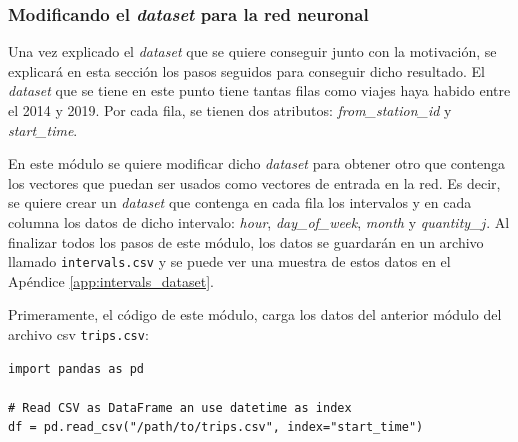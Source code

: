 
\subsubsection{Modificando el \textit{dataset} para la red neuronal}\label{dataset-creation}

Una vez explicado el \textit{dataset} que se quiere conseguir junto con la motivación, se explicará en esta sección los pasos seguidos para conseguir dicho resultado. El \textit{dataset} que se tiene en este punto tiene tantas filas como viajes haya habido entre el 2014 y 2019. Por cada fila, se tienen dos atributos: \textit{from\_station\_id} y \textit{start\_time}. 
\newline

En este módulo se quiere modificar dicho \textit{dataset} para obtener otro que contenga los vectores que puedan ser usados como vectores de entrada en la red. Es decir, se quiere crear un \textit{dataset} que contenga en cada fila los intervalos y en cada columna los datos de dicho intervalo: \textit{hour}, \textit{day\_of\_week}, \textit{month} y \textit{quantity\_$j$}. Al finalizar todos los pasos de este módulo, los datos se guardarán en un archivo llamado \small{\verb|intervals.csv|} y se puede ver una muestra de estos datos en el Apéndice \ref{app:intervals_dataset}.
\newline

Primeramente, el código de este módulo, carga los datos del anterior módulo del archivo \acrshort{csv} \small{\verb|trips.csv|}:
\begin{verbatim}
import pandas as pd

# Read CSV as DataFrame an use datetime as index
df = pd.read_csv("/path/to/trips.csv", index="start_time")
\end{verbatim}

